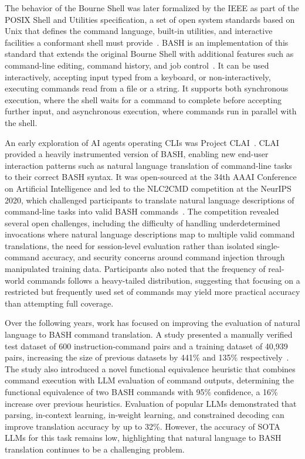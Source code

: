 \documentclass[
english,                 %
bibtex,                  %
]{kththesis}
\numberwithin{listing}{chapter}
\begin{document}
The behavior of the Bourne Shell was later formalized by the \gls{IEEE} as part of the \gls{POSIX} Shell and Utilities specification, a set of open system standards based on Unix that defines the command language, built-in utilities, and interactive facilities a conformant shell must provide~\cite{ramey_whats_1994}. \Gls{BASH} is an implementation of this standard that extends the original Bourne Shell with additional features such as command-line editing, command history, and job control~\cite{ramsey_gnu_2025}. It can be used interactively, accepting input typed from a keyboard, or non-interactively, executing commands read from a file or a string. It supports both synchronous execution, where the shell waits for a command to complete before accepting further input, and asynchronous execution, where commands run in parallel with the shell.

An early exploration of \gls{AI} agents operating \glspl{CLI} was Project \Gls{CLAI}~\cite{agarwal_project_2020}. \Gls{CLAI} provided a heavily instrumented version of \gls{BASH}, enabling new end-user interaction patterns such as natural language translation of command-line tasks to their correct \gls{BASH} syntax. It was open-sourced at the 34th \gls{AAAI} Conference on Artificial Intelligence and led to the \Gls{NLC2CMD} competition at the \gls{NeurIPS} 2020, which challenged participants to translate natural language descriptions of command-line tasks into valid \gls{BASH} commands~\cite{agarwal_neurips_2021}. The competition revealed several open challenges, including the difficulty of handling underdetermined invocations where natural language descriptions map to multiple valid command translations, the need for session-level evaluation rather than isolated single-command accuracy, and security concerns around command injection through manipulated training data. Participants also noted that the frequency of real-world commands follows a heavy-tailed distribution, suggesting that focusing on a restricted but frequently used set of commands may yield more practical accuracy than attempting full coverage.

Over the following years, work has focused on improving the evaluation of natural language to \gls{BASH} command translation. A study presented a manually verified test dataset of 600 instruction-command pairs and a training dataset of 40,939 pairs, increasing the size of previous datasets by 441\% and 135\% respectively~\cite{westenfelder_llm-supported_2025}. The study also introduced a novel functional equivalence heuristic that combines command execution with \gls{LLM} evaluation of command outputs, determining the functional equivalence of two \gls{BASH} commands with 95\% confidence, a 16\% increase over previous heuristics. Evaluation of popular \glspl{LLM} demonstrated that parsing, in-context learning, in-weight learning, and constrained decoding can improve translation accuracy by up to 32\%. However, the accuracy of \gls{SOTA} \glspl{LLM} for this task remains low, highlighting that natural language to \gls{BASH} translation continues to be a challenging problem.
\end{document}

